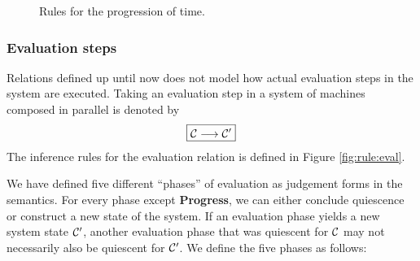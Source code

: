 \begin{figure}[!ht]
\caption{Rules for the progression of time.}\label{fig:rule:progress}
\end{figure}

\subsubsection{Evaluation steps}

Relations defined up until now does not model how actual evaluation steps in the
system are executed. Taking an evaluation step in a system of machines composed
in parallel is denoted by
\begin{equation*}
\boxed{\mathcal{C} \longrightarrow \mathcal{C}'}
\end{equation*}
The inference rules for the evaluation relation is defined in Figure
\ref{fig:rule:eval}.

We have defined five different ``phases'' of evaluation as judgement forms in
the semantics. For every phase except \textbf{Progress}, we can either conclude
quiescence or construct a new state of the system. If an evaluation phase yields
a new system state $\mathcal{C}'$, another evaluation phase that was quiescent for $\mathcal{C}$
may not necessarily also be quiescent for $\mathcal{C}'$. We define the five phases as
follows:


